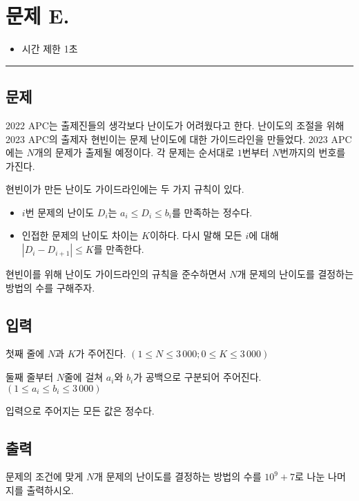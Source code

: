 \newpage
\section*{{\Large 문제 E.} }

\begin{itemize}
    \item 시간 제한 \tabto{2cm} 1초
\end{itemize}

\hrule

\subsection*{문제}

2022 APC는 출제진들의 생각보다 난이도가 어려웠다고 한다. 난이도의 조절을 위해 2023 APC의 출제자 현빈이는 문제 난이도에 대한 가이드라인을 만들었다. 2023 APC에는 $N$개의 문제가 출제될 예정이다. 각 문제는 순서대로 $1$번부터 $N$번까지의 번호를 가진다.

현빈이가 만든 난이도 가이드라인에는 두 가지 규칙이 있다.

\begin{itemize}
    \item $i$번 문제의 난이도 $D_{i}$는 $a_{i}\leq D_{i}\leq b_{i}$를 만족하는 정수다.
    \item 인접한 문제의 난이도 차이는 $K$이하다. 다시 말해 모든 $i$에 대해 $|D_{i}-D_{i+1}|\leq K$를 만족한다.
\end{itemize}

현빈이를 위해 난이도 가이드라인의 규칙을 준수하면서 $N$개 문제의 난이도를 결정하는 방법의 수를 구해주자.

\subsection*{입력}

첫째 줄에 $N$과 $K$가 주어진다. $(1\leq N\leq 3\,000; 0\leq K \leq 3\,000)$

둘째 줄부터 $N$줄에 걸쳐 $a_{i}$와 $b_{i}$가 공백으로 구분되어 주어진다. $(1\leq a_{i} \leq b_{i} \leq 3\,000)$

입력으로 주어지는 모든 값은 정수다.

\subsection*{출력}

문제의 조건에 맞게 $N$개 문제의 난이도를 결정하는 방법의 수를 $10^{9}+7$로 나눈 나머지를 출력하시오.

